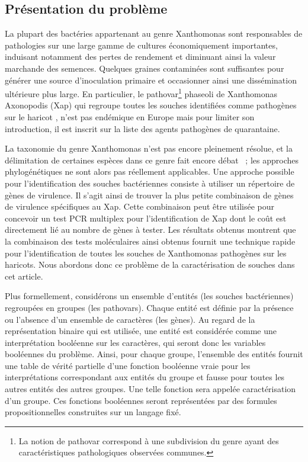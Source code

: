 \documentclass[a4paper,10pt]{article}
\begin{document}
\subsection{Présentation du problème}
La plupart des bactéries appartenant au genre Xanthomonas sont responsables de pathologies sur une large gamme de cultures économiquement importantes,  induisant notamment  des pertes de rendement et diminuant ainsi la valeur marchande des semences. Quelques graines contaminées sont suffisantes pour générer une source d'inoculation primaire et occasionner ainsi une dissémination ultérieure plus large. En particulier, le pathovar\footnote{La notion de pathovar correspond à une subdivision du genre ayant des caractéristiques pathologiques observées communes.} phaseoli de  Xanthomonas Axonopodis (Xap) qui regroupe toutes les souches identifiées comme pathogènes sur le haricot \cite{Vauterin1995}, n'est pas endémique en Europe mais pour limiter son introduction, il est inscrit sur la liste des agents pathogènes de quarantaine.

La taxonomie du genre Xanthomonas n'est pas encore pleinement résolue, et la délimitation de certaines espèces dans ce genre fait encore débat \cite{Schaad2005}~; les approches phylogénétiques ne sont alors pas réellement applicables. Une approche possible pour l'identification des souches bactériennes consiste à utiliser un répertoire de gènes de virulence. Il s'agit ainsi de trouver la plus petite combinaison de gènes de virulence spécifiques au Xap. Cette combinaison peut être utilisée pour concevoir un test PCR multiplex pour l'identification de Xap \cite{Boureau2013,Boureau2012} dont le coût est directement lié au nombre de gènes à tester. Les résultats obtenus
montrent que la combinaison des tests moléculaires ainsi obtenus fournit une technique rapide pour l'identification de toutes les souches de Xanthomonas pathogènes sur les haricots. Nous abordons donc ce problème de la caractérisation de souches dans cet article.

Plus formellement, considérons un ensemble d'entités (les souches bactériennes) regroupées en groupes (les pathovars). Chaque entité est définie par la présence ou l'absence d'un ensemble de caractères (les gènes). Au regard de la représentation binaire qui est utilisée, une entité est considérée comme une interprétation booléenne sur les caractères, qui seront donc les variables booléennes du problème. Ainsi, pour chaque groupe, l'ensemble des entités fournit une table de vérité partielle d'une fonction booléenne vraie pour les interprétations correspondant aux entités du groupe et fausse pour toutes les autres entités des autres groupes. Une telle fonction sera appelée caractérisation d'un groupe. Ces fonctions booléennes seront représentées par des formules propositionnelles construites sur un langage fixé.
\end{document}
